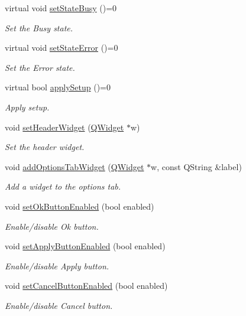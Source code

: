 \begin{DoxyCompactItemize}
virtual void \hyperlink{classmdt_abstract_port_setup_dialog_ae69fe60533e2df56f790e2522bb81592}{set\-State\-Busy} ()=0
\begin{DoxyCompactList}\small\item\em Set the Busy state. \end{DoxyCompactList}\item 
virtual void \hyperlink{classmdt_abstract_port_setup_dialog_a7cd081326d0935ea06d617b821795bb9}{set\-State\-Error} ()=0
\begin{DoxyCompactList}\small\item\em Set the Error state. \end{DoxyCompactList}\item 
virtual bool \hyperlink{classmdt_abstract_port_setup_dialog_ab090cd4da49eb9f2f1fc2f507bdb9717}{apply\-Setup} ()=0
\begin{DoxyCompactList}\small\item\em Apply setup. \end{DoxyCompactList}\item 
void \hyperlink{classmdt_abstract_port_setup_dialog_ab01700b5a09fc1b6c5f6f62e77148b43}{set\-Header\-Widget} (\hyperlink{class_q_widget}{Q\-Widget} $\ast$w)
\begin{DoxyCompactList}\small\item\em Set the header widget. \end{DoxyCompactList}\item 
void \hyperlink{classmdt_abstract_port_setup_dialog_ad21fb0a1f6f2c175d12fa066c4f3f5a9}{add\-Options\-Tab\-Widget} (\hyperlink{class_q_widget}{Q\-Widget} $\ast$w, const Q\-String \&label)
\begin{DoxyCompactList}\small\item\em Add a widget to the options tab. \end{DoxyCompactList}\item 
void \hyperlink{classmdt_abstract_port_setup_dialog_a19f18be7722d2437dbab87b7a568b216}{set\-Ok\-Button\-Enabled} (bool enabled)
\begin{DoxyCompactList}\small\item\em Enable/disable Ok button. \end{DoxyCompactList}\item 
void \hyperlink{classmdt_abstract_port_setup_dialog_a4fa65cf9827a81bf501008ced33b69ab}{set\-Apply\-Button\-Enabled} (bool enabled)
\begin{DoxyCompactList}\small\item\em Enable/disable Apply button. \end{DoxyCompactList}\item 
void \hyperlink{classmdt_abstract_port_setup_dialog_a7a63a08869469615f5be2c10fd490641}{set\-Cancel\-Button\-Enabled} (bool enabled)
\begin{DoxyCompactList}\small\item\em Enable/disable Cancel button. \end{DoxyCompactList}\end{DoxyCompactItemize}


